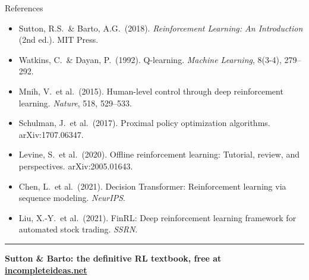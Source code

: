 \documentclass[8pt,aspectratio=169]{beamer}
\newcommand{\bottomnote}[1]{%
\vfill
\vspace{-2mm}
\textcolor{mllavender2}{\rule{\textwidth}{0.4pt}}
\vspace{1mm}
\footnotesize
\textbf{#1}
}
\begin{document}
\begin{frame}{References}
\scriptsize
\begin{itemize}
\item Sutton, R.S.\ \& Barto, A.G.\ (2018). \textit{Reinforcement Learning: An Introduction} (2nd ed.). MIT Press.
\item Watkins, C.\ \& Dayan, P.\ (1992). Q-learning. \textit{Machine Learning}, 8(3-4), 279--292.
\item Mnih, V.\ et al.\ (2015). Human-level control through deep reinforcement learning. \textit{Nature}, 518, 529--533.
\item Schulman, J.\ et al.\ (2017). Proximal policy optimization algorithms. arXiv:1707.06347.
\item Levine, S.\ et al.\ (2020). Offline reinforcement learning: Tutorial, review, and perspectives. arXiv:2005.01643.
\item Chen, L.\ et al.\ (2021). Decision Transformer: Reinforcement learning via sequence modeling. \textit{NeurIPS}.
\item Liu, X.-Y.\ et al.\ (2021). FinRL: Deep reinforcement learning framework for automated stock trading. \textit{SSRN}.
\end{itemize}
\bottomnote{Sutton \& Barto: the definitive RL textbook, free at \url{incompleteideas.net}}
\end{frame}
\end{document}
